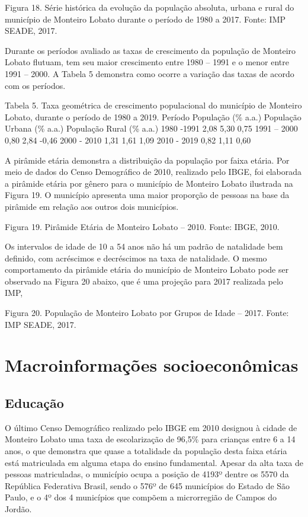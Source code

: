 Figura 18. Série histórica da evolução da população absoluta, urbana e rural do município de Monteiro Lobato durante o período de 1980 a 2017.
Fonte: IMP SEADE, 2017.

Durante os períodos avaliado as taxas de crescimento da população de Monteiro Lobato flutuam, tem seu maior crescimento entre 1980 – 1991 e o menor entre 1991 – 2000. A Tabela 5 demonstra como ocorre a variação das taxas de acordo com os períodos.

Tabela 5. Taxa geométrica de crescimento populacional do município de Monteiro Lobato, durante o período de 1980 a 2019.
Período	População
(\% a.a.)	População Urbana (\% a.a.)	População Rural (\% a.a.)
1980 -1991	2,08	5,30	0,75
1991 – 2000	0,80	2,84	-0,46
2000 - 2010	1,31	1,61	1,09
2010 - 2019	0,82	1,11	0,60

A pirâmide etária demonstra a distribuição da população por faixa etária. Por meio de dados do Censo Demográfico de 2010, realizado pelo IBGE, foi elaborada a pirâmide etária por gênero para o município de Monteiro Lobato ilustrada na Figura 19. O município apresenta uma maior proporção de pessoas na base da pirâmide em relação aos outros dois municípios.

 
Figura 19.  Pirâmide Etária de Monteiro Lobato – 2010.
Fonte: IBGE, 2010.

Os intervalos de idade de 10 a 54 anos não há um padrão de natalidade bem definido, com acréscimos e decréscimos na taxa de natalidade. O mesmo comportamento da pirâmide etária do município de Monteiro Lobato pode ser observado na Figura 20 abaixo, que é uma projeção para 2017 realizada pelo IMP,  
 
Figura 20. População de Monteiro Lobato por Grupos de Idade – 2017.
Fonte: IMP SEADE, 2017.

\section{Macroinformações socioeconômicas}
\subsection{Educação}

O último Censo Demográfico realizado pelo IBGE em 2010 designou à cidade de Monteiro Lobato uma taxa de escolarização de 96,5\% para crianças entre 6 a 14 anos, o que demonstra que quase a totalidade da população desta faixa etária está matriculada em alguma etapa do ensino fundamental. Apesar da alta taxa de pessoas matriculadas, o município ocupa a posição de 4193º dentre os 5570 da República Federativa Brasil, sendo o 576º de 645 municípios do Estado de São Paulo, e o 4º dos 4 municípios que compõem a microrregião de Campos do Jordão.

